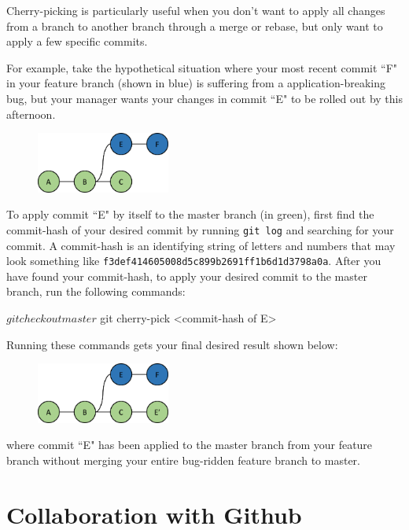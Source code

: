 \documentclass[12pt]{report}
\begin{document}
Cherry-picking is particularly useful when you don't want to apply all changes from a branch to another branch through a merge or rebase, but only want to apply a few specific commits.

For example, take the hypothetical situation where your most recent commit ``F" in your feature branch (shown in blue) is suffering from a application-breaking bug, but your manager wants your changes in commit ``E" to be rolled out by this afternoon.

\begin{figure}[h]
\center
\includegraphics[height=2cm]{feature}
\end{figure}

To apply commit ``E" by itself to the master branch (in green), first find the commit-hash of your desired commit by running \texttt{git log} and searching for your commit.  A commit-hash is an identifying string of letters and numbers that may look something like \texttt{f3def414605008d5c899b2691ff1b6d1d3798a0a}.  After you have found your commit-hash, to apply your desired commit to the master branch, run the following commands:
\begin{blockcode}
$ git checkout master
$ git cherry-pick <commit-hash of E>
\end{blockcode}

Running these commands gets your final desired result shown below:

\begin{figure}[h]
\center
\includegraphics[height=2cm]{cherrypick}
\end{figure}

where commit ``E" has been applied to the master branch from your feature branch without merging your entire bug-ridden feature branch to master.

\section{Collaboration with Github}
\end{document}
